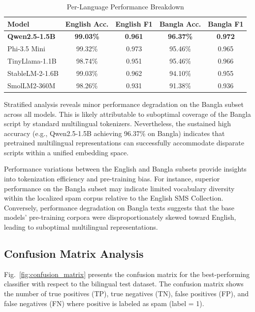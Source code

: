 \documentclass[journal]{IEEEtran}
\begin{document}
\begin{table}[htbp]
\caption{Per-Language Performance Breakdown}
\label{tab:lang_results}
\centering
\begin{tabular}{lcccc}
\toprule
\textbf{Model} & \textbf{English Acc.} & \textbf{English F1} & \textbf{Bangla Acc.} & \textbf{Bangla F1} \\
\midrule
\rowcolor{gray!20} \textbf{Qwen2.5-1.5B} & \textbf{99.03\%} & \textbf{0.961} & \textbf{96.37\%} & \textbf{0.972} \\
Phi-3.5 Mini & 99.32\% & 0.973 & 95.46\% & 0.965 \\
TinyLlama-1.1B & 98.74\% & 0.951 & 95.46\% & 0.966 \\
StableLM-2-1.6B & 99.03\% & 0.962 & 94.10\% & 0.955 \\
SmolLM2-360M & 98.26\% & 0.931 & 91.38\% & 0.936 \\
\bottomrule
\end{tabular}
\end{table}



Stratified analysis reveals minor performance degradation on the Bangla subset across all models. This is likely attributable to suboptimal coverage of the Bangla script by standard multilingual tokenizers. Nevertheless, the sustained high accuracy (e.g., Qwen2.5-1.5B achieving 96.37\% on Bangla) indicates that pretrained multilingual representations can successfully accommodate disparate scripts within a unified embedding space.

Performance variations between the English and Bangla subsets provide insights into tokenization efficiency and pre-training bias. For instance, superior performance on the Bangla subset may indicate limited vocabulary diversity within the localized spam corpus relative to the English SMS Collection. Conversely, performance degradation on Bangla texts suggests that the base models' pre-training corpora were disproportionately skewed toward English, leading to suboptimal multilingual representations.

\subsection{Confusion Matrix Analysis}

Fig.~\ref{fig:confusion_matrix} presents the confusion matrix for the best-performing
classifier with respect to the bilingual test dataset. The confusion
matrix shows the number of true positives (TP), true negatives (TN),
false positives (FP), and false negatives (FN) where positive is labeled
as spam (label = 1).
\end{document}
